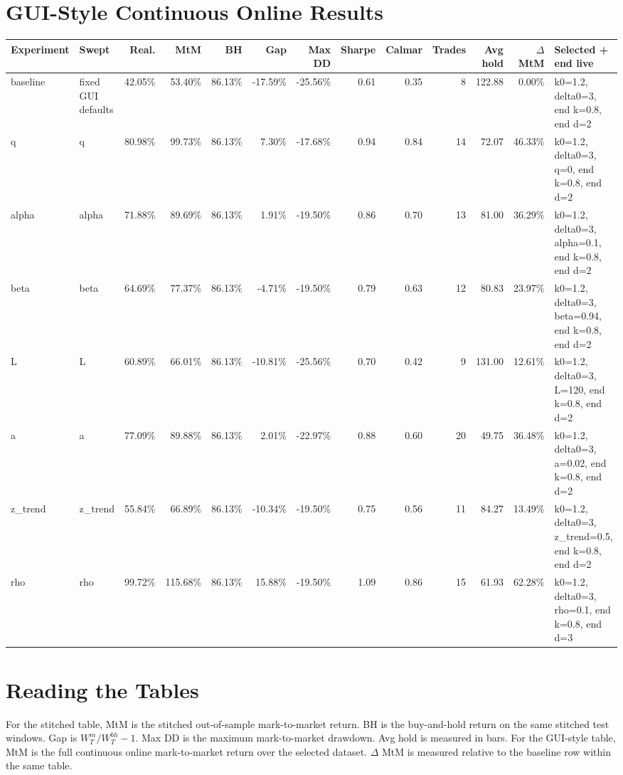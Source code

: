 \documentclass[10pt]{article}
\begin{document}
\section*{GUI-Style Continuous Online Results}
\scriptsize
\setlength{\tabcolsep}{3pt}
\begin{tabular}{p{0.85in}p{0.95in}rrrrrrrrrrp{1.15in}}
\toprule
Experiment & Swept & Real. & MtM & BH & Gap & Max DD & Sharpe & Calmar & Trades & Avg hold & $\Delta$ MtM & Selected + end live \\
\midrule
baseline & fixed GUI defaults & 42.05\% & 53.40\% & 86.13\% & -17.59\% & -25.56\% & 0.61 & 0.35 & 8 & 122.88 & 0.00\% & k0=1.2, delta0=3, end k=0.8, end d=2 \\
q & q & 80.98\% & 99.73\% & 86.13\% & 7.30\% & -17.68\% & 0.94 & 0.84 & 14 & 72.07 & 46.33\% & k0=1.2, delta0=3, q=0, end k=0.8, end d=2 \\
alpha & alpha & 71.88\% & 89.69\% & 86.13\% & 1.91\% & -19.50\% & 0.86 & 0.70 & 13 & 81.00 & 36.29\% & k0=1.2, delta0=3, alpha=0.1, end k=0.8, end d=2 \\
beta & beta & 64.69\% & 77.37\% & 86.13\% & -4.71\% & -19.50\% & 0.79 & 0.63 & 12 & 80.83 & 23.97\% & k0=1.2, delta0=3, beta=0.94, end k=0.8, end d=2 \\
L & L & 60.89\% & 66.01\% & 86.13\% & -10.81\% & -25.56\% & 0.70 & 0.42 & 9 & 131.00 & 12.61\% & k0=1.2, delta0=3, L=120, end k=0.8, end d=2 \\
a & a & 77.09\% & 89.88\% & 86.13\% & 2.01\% & -22.97\% & 0.88 & 0.60 & 20 & 49.75 & 36.48\% & k0=1.2, delta0=3, a=0.02, end k=0.8, end d=2 \\
z\_trend & z\_trend & 55.84\% & 66.89\% & 86.13\% & -10.34\% & -19.50\% & 0.75 & 0.56 & 11 & 84.27 & 13.49\% & k0=1.2, delta0=3, z\_trend=0.5, end k=0.8, end d=2 \\
rho & rho & 99.72\% & 115.68\% & 86.13\% & 15.88\% & -19.50\% & 1.09 & 0.86 & 15 & 61.93 & 62.28\% & k0=1.2, delta0=3, rho=0.1, end k=0.8, end d=3 \\
\bottomrule
\end{tabular}
\normalsize

\section*{Reading the Tables}
For the stitched table, MtM is the stitched out-of-sample mark-to-market return. BH is the buy-and-hold
return on the same stitched test windows. Gap is $W_T^m/W_T^{bh}-1$.
Max DD is the maximum mark-to-market drawdown. Avg hold is measured in bars.
For the GUI-style table, MtM is the full continuous online mark-to-market return
over the selected dataset. $\Delta$ MtM is measured relative to the baseline row
within the same table.
\end{document}
